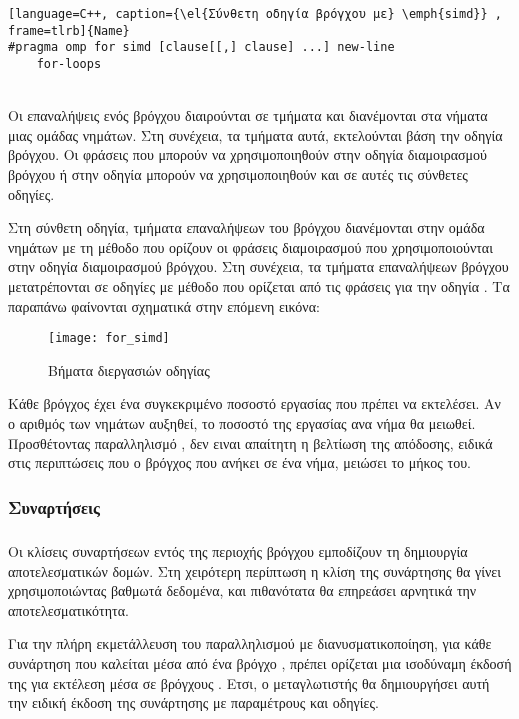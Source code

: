 \begin{lstlisting}[language=C++, caption={\el{Σύνθετη οδηγία βρόγχου με} \emph{simd}} , frame=tlrb]{Name}
#pragma omp for simd [clause[[,] clause] ...] new-line
	for-loops
\end{lstlisting}

\ \\
Οι επαναλήψεις ενός βρόγχου διαιρούνται σε τμήματα και διανέμονται στα νήματα μιας ομάδας νημάτων. Στη συνέχεια, τα τμήματα αυτά, εκτελούνται βάση την οδηγία \emph{} βρόγχου. Οι φράσεις που μπορούν να χρησιμοποιηθούν στην οδηγία διαμοιρασμού βρόγχου ή στην οδηγία \emph{} μπορούν να χρησιμοποιηθούν και σε αυτές τις σύνθετες οδηγίες.

Στη σύνθετη οδηγία, τμήματα επαναλήψεων του βρόγχου διανέμονται στην ομάδα νημάτων με τη μέθοδο που ορίζουν οι φράσεις διαμοιρασμού που χρησιμοποιούνται στην οδηγία διαμοιρασμού βρόγχου. Στη συνέχεια, τα τμήματα επαναλήψεων βρόγχου μετατρέπονται σε οδηγίες \emph{} με μέθοδο που ορίζεται από τις φράσεις για την οδηγία \emph{}. Τα παραπάνω φαίνονται σχηματικά στην επόμενη εικόνα:
\ \\
\begin{figure}[h]
\texttt{[image: for\_simd]}
\centering
\captionsetup{justification=centering, singlelinecheck=false}
	\caption{ Βήματα διεργασιών οδηγίας \emph{}}
\label{fig:for_simd}
\end{figure}

Κάθε βρόγχος έχει ένα συγκεκριμένο ποσοστό εργασίας που πρέπει να εκτελέσει. Αν ο αριθμός των νημάτων αυξηθεί, το ποσοστό της εργασίας ανα νήμα θα μειωθεί. Προσθέτοντας παραλληλισμό \emph{}, δεν ειναι απαίτητη η βελτίωση της απόδοσης, ειδικά στις περιπτώσεις που ο \emph{} βρόγχος που ανήκει σε ένα νήμα, μειώσει το μήκος του.
\clearpage{}

\subsubsection{Συναρτήσεις \emph{}}
\subparagraph{}
Οι κλίσεις συναρτήσεων εντός της περιοχής βρόγχου \emph{} εμποδίζουν τη δημιουργία αποτελεσματικών \emph{} δομών. Στη χειρότερη περίπτωση η κλίση της συνάρτησης θα γίνει χρησιμοποιώντας βαθμωτά δεδομένα, και πιθανότατα θα επηρεάσει αρνητικά την αποτελεσματικότητα.

Για την πλήρη εκμετάλλευση του παραλληλισμού με διανυσματικοποίηση, για κάθε συνάρτηση που καλείται μέσα από ένα βρόγχο \emph{}, πρέπει ορίζεται μια ισοδύναμη έκδοσή της για εκτέλεση μέσα σε βρόγχους \emph{}. Ετσι, ο μεταγλωτιστής θα δημιουργήσει αυτή την ειδική έκδοση της συνάρτησης με \emph{} παραμέτρους και οδηγίες.

